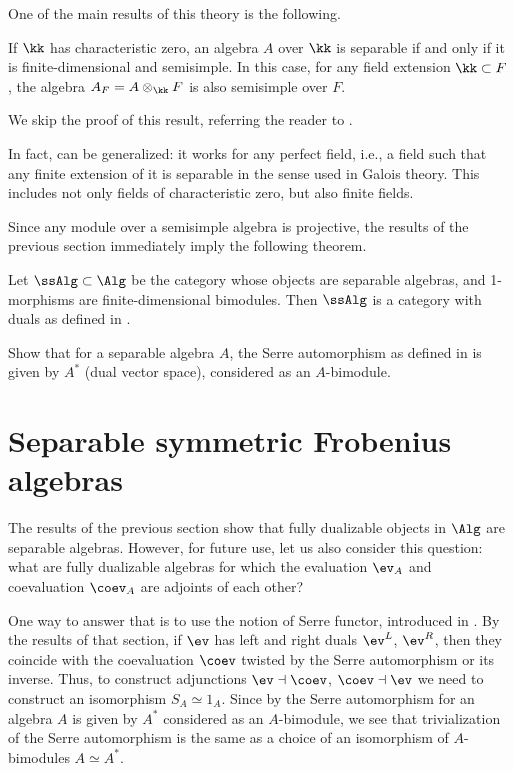 One of the main results of this theory is the following.
\begin{theorem}\label{t:separable-ss}
  If $\kk$ has characteristic zero, an algebra $A$ over $\kk$ is
  separable if and only if it is finite-dimensional and semisimple.
  In this case, for any field extension $\kk\subset F$, the algebra
  $A_F=A\otimes_\kk F$ is also semisimple over $F$.
\end{theorem}
We skip the proof of this result, referring the reader to
\cite[Section 10.7]{pierce}.

\begin{remark}
  In fact,  can be generalized: it works for any perfect
  field, i.e., a field such that any finite extension of it is separable in the
  sense used in Galois theory. This includes not only fields of characteristic
  zero, but also finite fields.
\end{remark}




Since any module over a semisimple algebra is projective,
the results of the previous section immediately imply the following theorem.
\begin{theorem}\label{t:ssalg}
  Let $\ssAlg\subset \Alg$ be the category whose objects are separable
  algebras, and 1-morphisms are finite-dimensional
  bimodules. Then $\ssAlg$ is a category with duals as defined in
  .
\end{theorem}

\begin{exercise}\label{ec:serre-separable}
  Show that for a separable algebra $A$, the Serre automorphism as defined in
   is given by $A^*$ (dual vector space), considered as
  an $A$-bimodule.
\end{exercise}




\section{Separable symmetric Frobenius algebras}\label{s:ssfrob}
The results of the previous section show that fully dualizable objects in $\Alg$ are
separable algebras. However, for future use, let us also consider this question:
what are fully dualizable algebras for which the evaluation $\ev_A$ and
coevaluation $\coev_A$ are adjoints of each other?


One way to answer that is to use the notion of Serre functor, introduced in
. By the results of that section, if $\ev$ has left and right
duals $\ev^L$, $\ev^R$, then they coincide with the coevaluation $\coev$ twisted
by the Serre automorphism or its inverse. Thus, to construct adjunctions
$\ev\dashv\coev$, $\coev\dashv\ev$ we need to construct an isomorphism
$S_A\simeq 1_A$. Since by  the Serre automorphism for
an algebra $A$ is given by $A^*$ considered as an $A$-bimodule, we see that
trivialization of the Serre automorphism is the same as a choice of an
isomorphism of $A$-bimodules $A\simeq A^*$.

